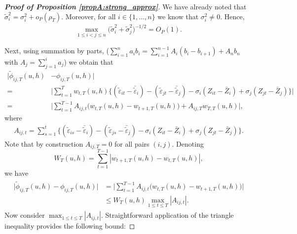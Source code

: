 \documentclass[a4paper,12pt]{article}
\begin{document}
\begin{proof}[\textnormal{\textbf{Proof of Proposition \ref{propA:strong_approx}}}]
We have already noted that $\widetilde{\sigma}_i^2 = \sigma_i^2 + o_P(\rho_T)$. Moreover, for all $i \in \{1, \ldots, n\}$ we know that $\sigma_i^2 \neq 0$. Hence, 
\begin{align}\label{eqA:strong_approx:bound3}
\max_{1\le i < j \le n}\big(\widetilde{\sigma}_i^2+ \widetilde{\sigma}_j^2 \big)^{-1/2}  = O_P(1).
\end{align}

Next, using summation by parts, ($\sum_{i=1}^n a_i b_i = \sum_{i=1}^{n-1} A_i (b_i - b_{i+1}) + A_n b_n$ with \linebreak $A_j = \sum_{j=1}^i a_j$) 
we obtain that 
\begin{align*}
\big| \widetilde{\phi}_{ij, T}(u,h) &- \phi_{ij, T}(u,h) \big|  \\
=&\bigg|\sum_{t=1}^T w_{t,T}(u,h) \big\{ (\widetilde{\varepsilon}_{it} - \bar{\widetilde{\varepsilon}}_i) - (\widetilde{\varepsilon}_{jt} - \bar{\widetilde{\varepsilon}}_j) -{\sigma}_i (Z_{it} - \bar{Z}_i) + {\sigma}_j (Z_{jt} - \bar{Z}_j) \big\}\bigg|  \\
=&\Big|\sum_{t=1}^{T-1} A_{ij, t} \big(w_{t,T}(u,h) -w_{t+1,T}(u,h)\big) + A_{ij, T} w_{T,T}(u,h)\Big|,
\end{align*}
where 
\begin{align*}
A_{ij, t} = \sum_{s=1}^t \big\{ (\widetilde{\varepsilon}_{is} - \bar{\widetilde{\varepsilon}}_i)  - (\widetilde{\varepsilon}_{js} - \bar{\widetilde{\varepsilon}}_j) -{\sigma}_i (Z_{it} - \bar{Z}_i) + {\sigma}_j (Z_{jt} - \bar{Z}_j) \big\}.
\end{align*}
Note that by construction $A_{ij, T} = 0$ for all pairs $(i, j)$. Denoting 
\[ W_T(u,h) = \sum\limits_{t=1}^{T-1} |w_{t+1,T}(u,h) - w_{t,T}(u,h)|,\]
we have 
\begin{align}\label{eq-strongapprox-bound3}
\begin{split}
\big| \widetilde{\phi}_{ij, T}(u,h) - \phi_{ij, T}(u,h) \big| &= \Big|\sum_{t=1}^{T-1} A_{ij, t} \big(w_{t,T}(u,h) -w_{t+1,T}(u,h)\big)\Big|\\
&\le W_T(u, h)\max_{1 \le t \le T} |A_{ij, t}|.
\end{split}
\end{align}
Now consider $\max_{1 \le t \le T} |A_{ij, t}|$. Straightforward application of the triangle inequality provides the following bound:


\end{proof}
\end{document}
